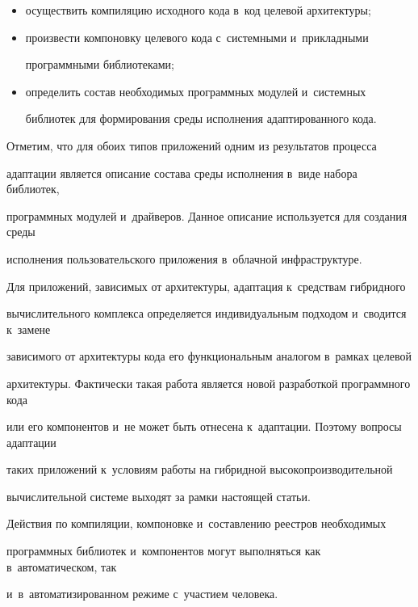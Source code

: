       \begin{itemize}

      \item осуществить компиляцию исходного кода в~код целевой архитектуры;

      \item произвести компоновку целевого кода с~системными и~прикладными 

программными библиотеками;

      \item определить состав необходимых программных модулей и~системных 

библиотек для формирования среды исполнения адаптированного кода.

      \end{itemize}

      

      Отметим, что для обоих типов приложений одним из результатов процесса 

адаптации является описание состава среды исполнения в~виде набора библиотек, 

программных модулей и~драйверов. Данное описание используется для создания среды 

исполнения пользовательского приложения в~облачной инфраструктуре.

      

      Для приложений, зависимых от архитектуры, адаптация к~средствам гиб\-рид\-но\-го 

вычислительного комплекса определяется индивидуальным подходом и~сводится к~замене 

зависимого от архитектуры кода его функциональным аналогом в~рамках целевой 

архитектуры. Фактически такая работа является новой разработкой программного кода 

или его компонентов и~не может быть отнесена к~адаптации. Поэтому вопросы адаптации 

таких приложений к~условиям работы на гибридной высокопроизводительной 

вычислительной системе выходят за рамки настоящей статьи.

      

      Действия по компиляции, компоновке и~составлению реестров необходимых 

программных библиотек и~компонентов могут выполняться как в~автоматическом, так 

и~в~автоматизированном режиме с~участием человека. 


